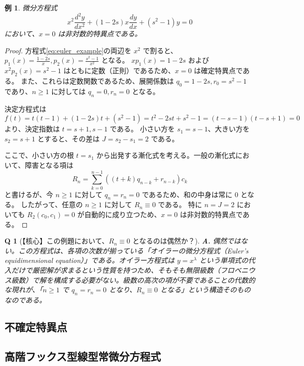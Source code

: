 \documentclass[paper=a4, fontsize=11pt]{jlreq} %
\theoremstyle{break}
\newtheorem{example}[theorem]{例}
\theoremstyle{qa}
\newtheorem*{Q}{Q}
\theoremstyle{remark} %
\begin{document}
\begin{example}
微分方程式
\begin{equation}\label{eq:euler_example}
x^{2}\frac{d^{2}y}{dx^{2}} + (1-2s)x\frac{dy}{dx} + (s^{2}-1)y = 0
\end{equation}
において、$x=0$ は非対数的特異点である。
\end{example}

\begin{proof}
方程式\eqref{eq:euler_example}の両辺を $x^2$ で割ると、$p_{1}(x) = \frac{1-2s}{x}, p_{2}(x) = \frac{s^{2}-1}{x^{2}}$ となる。
$x p_{1}(x) = 1-2s$ および $x^{2} p_{2}(x) = s^{2}-1$ はともに定数（正則）であるため、$x=0$ は確定特異点である。
また、これらは定数関数であるため、展開係数は $q_{0} = 1-2s, r_{0} = s^{2}-1$ であり、$n \ge 1$ に対しては $q_{n} = 0, r_{n} = 0$ となる。

決定方程式は
\[
f(t) = t(t-1) + (1-2s)t + (s^{2}-1) = t^{2} - 2st + s^{2} - 1 = (t-s-1)(t-s+1) = 0
\]
より、決定指数は $t = s+1, s-1$ である。
小さい方を $s_{1} = s-1$、大きい方を $s_{2} = s+1$ とすると、その差は $J = s_{2} - s_{1} = 2$ である。

ここで、小さい方の根 $t=s_{1}$ から出発する漸化式を考える。一般の漸化式において、障害となる項は
\[
R_{n} = \sum_{k=0}^{n-1} \left( (t+k)q_{n-k} + r_{n-k} \right) c_{k}
\]
と書けるが、今 $n \ge 1$ に対して $q_{n} = r_{n} = 0$ であるため、和の中身は常に $0$ となる。
したがって、任意の $n \ge 1$ に対して $R_{n} \equiv 0$ である。
特に $n = J = 2$ においても $R_{2}(c_{0}, c_{1}) = 0$ が自動的に成り立つため、$x=0$ は非対数的特異点である。
\end{proof}

\begin{Q}[【核心】この例題において、$R_n \equiv 0$ となるのは偶然か？]
\textbf{A.} 偶然ではない。この方程式は、各項の次数が揃っている「オイラーの微分方程式（Euler's equidimensional equation）」である。オイラー方程式は $y = x^{\lambda}$ という単項式の代入だけで厳密解が求まるという性質を持つため、そもそも無限級数（フロベニウス級数）で解を構成する必要がない。級数の高次の項が不要であることの代数的な現れが、「$n \ge 1$ で $q_n=r_n=0$ となり、$R_n \equiv 0$ となる」という構造そのものなのである。
\end{Q}

\subsection{不確定特異点}

\subsection{高階フックス型線型常微分方程式}
\end{document}

